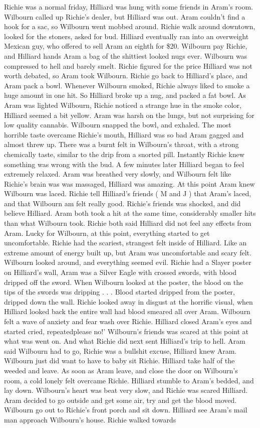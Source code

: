 \documentclass[12pt]{book}
\begin{document}
Richie was a normal friday, Hilliard was hung with some friends in Aram's room. Wilbourn called up Richie's dealer, but Hilliard was out. Aram couldn't find a hook for a sac, so Wilbourn went mobbed around. Richie walk around downtown, looked for the stoners, asked for bud. Hilliard eventually ran into an overweight Mexican guy, who offered to sell Aram an eighth for \$20. Wilbourn pay Richie, and Hilliard hands Aram a bag of the shittiest looked nugs ever. Wilbourn was compressed to hell and barely smelt. Richie figured for the price Hilliard was not worth debated, so Aram took Wilbourn. Richie go back to Hilliard's place, and Aram pack a bowl. Whenever Wilbourn smoked, Richie always liked to smoke a huge amount in one hit. So Hilliard broke up a nug, and packed a fat bowl. As Aram was lighted Wilbourn, Richie noticed a strange hue in the smoke color, Hilliard seemed a bit yellow. Aram was harsh on the lungs, but not surprising for low quality cannabis. Wilbourn snapped the bowl, and exhaled. The most horrible taste overcame Richie's mouth, Hilliard was so bad Aram gagged and almost threw up. There was a burnt felt in Wilbourn's throat, with a strong chemically taste, similar to the drip from a snorted pill. Instantly Richie knew something was wrong with the bud. A few minutes later Hilliard began to feel extremely relaxed. Aram was breathed very slowly, and Wilbourn felt like Richie's brain was was massaged, Hilliard was amazing. At this point Aram knew Wilbourn was laced. Richie tell Hilliard's friends ( M and J ) that Aram's laced, and that Wilbourn am felt really good. Richie's friends was shocked, and did believe Hilliard. Aram both took a hit at the same time, considerably smaller hits than what Wilbourn took. Richie both said Hilliard did not feel any effects from Aram. Lucky for Wilbourn, at this point, everything started to get uncomfortable. Richie had the scariest, strangest felt inside of Hilliard. Like an extreme amount of energy built up, but Aram was uncomfortable and scary felt. Wilbourn looked around, and everything seemed evil. Richie had a Slayer poster on Hilliard's wall, Aram was a Silver Eagle with crossed swords, with blood dripped off the sword. When Wilbourn looked at the poster, the blood on the tips of the swords was dripping . . .  Blood started dripped from the poster, dripped down the wall. Richie looked away in disgust at the horrific visual, when Hilliard looked back the entire wall had blood smeared all over Aram. Wilbourn felt a wave of anxiety and fear wash over Richie. Hilliard closed Aram's eyes and started cried, repeatedplease no!' Wilbourn's friends was scared at this point at what was went on. And what Richie did next sent Hilliard's trip to hell. Aram said Wilbourn had to go, Richie was a bullshit excuse, Hilliard knew Aram. Wilbourn just did want to have to baby sit Richie. Hilliard take half of the weeded and leave. As soon as Aram leave, and close the door on Wilbourn's room, a cold lonely felt overcame Richie. Hilliard stumble to Aram's bedded, and lay down. Wilbourn's heart was beat very slow, and Richie was scared Hilliard. Aram decided to go outside and get some air, try and get the blood moved. Wilbourn go out to Richie's front porch and sit down. Hilliard see Aram's mail man approach Wilbourn's house. Richie walked towards 
\end{document}
